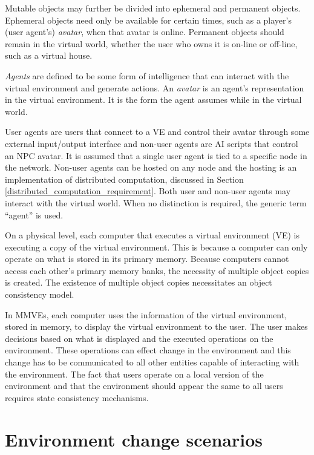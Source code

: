 Mutable objects may further be divided into ephemeral and permanent objects. Ephemeral objects need only be available for certain times, such as a player's (user agent's) \emph{avatar}, when that avatar is online. Permanent objects should remain in the virtual world, whether the user who owns it is on-line or off-line, such as a virtual house.

\emph{Agents} are defined to be some form of intelligence that can interact with the virtual environment and generate actions. An \emph{avatar} is an agent's representation in the virtual environment. It is the form the agent assumes while in the virtual world.

User agents are users that connect to a VE and control their avatar through some external input/output interface and non-user agents are AI scripts that control an NPC avatar. It is assumed that a single user agent is tied to a specific node in the network. Non-user agents can be hosted on any node and the hosting is an implementation of distributed computation, discussed in Section \ref{distributed_computation_requirement}. Both user and non-user agents may interact with the virtual world. When no distinction is required, the generic term ``agent'' is used.

On a physical level, each computer that executes a virtual environment (VE) is executing a copy of the virtual environment. This is because a computer can only operate on what is stored in its primary memory. Because computers cannot access each other's primary memory banks, the necessity of multiple object copies is created. The existence of multiple object copies necessitates an object consistency model.

In MMVEs, each computer uses the information of the virtual environment, stored in memory, to display the virtual environment to the user. The user makes decisions based on what is displayed and the executed operations on the environment. These operations can effect change in the environment and this change has to be communicated to all other entities capable of interacting with the environment. The fact that users operate on a local version of the environment and that the environment should appear the same to all users requires state consistency mechanisms.

\section{Environment change scenarios}
\label{environment_change_scenarios}


